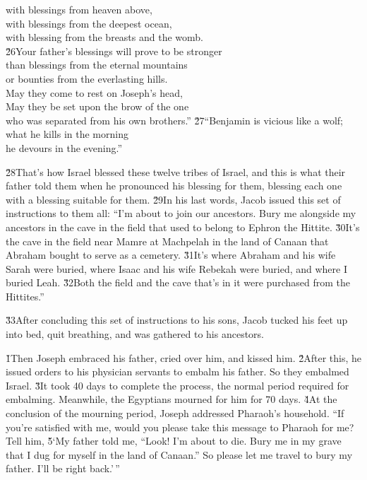 \begin{poetry}
\poeml with blessings from heaven above, \\
\poemll    with blessings from the deepest ocean, \\
\poeml with blessing from the breasts and the womb. \\
\poeml \v{26}Your father's blessings will prove to be stronger \\
\poemll    than blessings from the eternal mountains \\
\poemlll       or bounties from the everlasting hills. \\
\poeml May they come to rest on Joseph's head, \\
\poemll    May they be set upon the brow of the one \\
\poemlll       who was separated from his own brothers.''
\poeml \v{27}``Benjamin is vicious like a wolf; \\
\poemll    what he kills in the morning \\
\poemlll       he devours in the evening.''
\end{poetry}

\v{28}That's how Israel blessed these twelve tribes of Israel, and this is what their father told them when he pronounced his blessing for them, blessing each one with a blessing suitable for them. \v{29}In his last words, Jacob issued this set of instructions to them all: ``I'm about to join our ancestors. Bury me alongside my ancestors in the cave in the field that used to belong to Ephron the Hittite. \v{30}It's the cave in the field near Mamre at Machpelah in the land of Canaan that Abraham bought to serve as a cemetery. \v{31}It's where Abraham and his wife Sarah were buried, where Isaac and his wife Rebekah were buried, and where I buried Leah. \v{32}Both the field and the cave that's in it were purchased from the Hittites.''

\v{33}After concluding this set of instructions to his sons, Jacob tucked his feet up into bed, quit breathing, and was gathered to his ancestors.

\v{1}Then Joseph embraced his father, cried over him, and kissed him. \v{2}After this, he issued orders to his physician servants to embalm his father. So they embalmed Israel. \v{3}It took 40 days to complete the process, the normal period required for embalming. Meanwhile, the Egyptians mourned for him for 70 days. \v{4}At the conclusion of the mourning period, Joseph addressed Pharaoh's household. ``If you're satisfied with me, would you please take this message to Pharaoh for me? Tell him, \v{5}`My father told me, ``Look! I'm about to die. Bury me in my grave that I dug for myself in the land of Canaan.'' So please let me travel to bury my father. I'll be right back.'\,''

